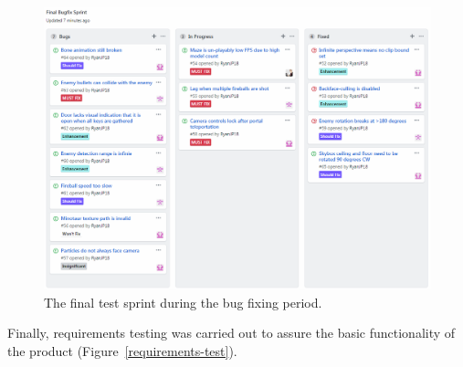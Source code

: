 \documentclass[a4paper, oneside, 11pt]{report}
\begin{document}
\begin{figure}[ht]
\centering
\includegraphics[width=\textwidth]{test-sprint.png}
\caption{The final test sprint during the bug fixing period.}
\label{test-sprint}
\end{figure}
Finally, requirements testing was carried out to assure the basic functionality of the product (Figure~\ref{requirements-test}).
\end{document}

